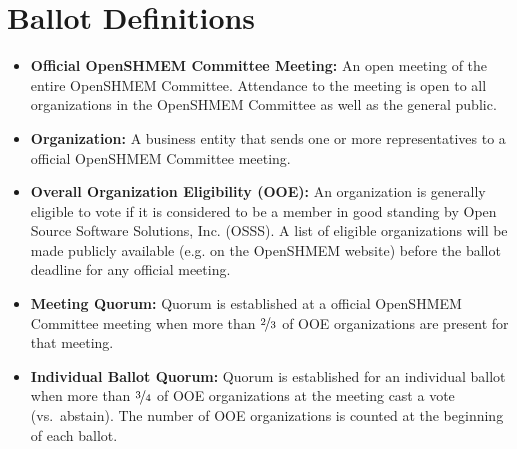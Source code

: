 \section{Ballot Definitions}

\begin{itemize}
\item {\bf Official OpenSHMEM Committee Meeting:} An open meeting of the entire
  OpenSHMEM Committee.  Attendance to the meeting is open to
  all organizations in the OpenSHMEM Committee as well as the general public.

\item {\bf Organization:} A business entity that sends one or more
  representatives to a official OpenSHMEM Committee meeting.

\item {\bf Overall Organization Eligibility (OOE):} An organization is
  generally eligible to vote if it
  is considered to be a member in good
  standing by Open Source Software Solutions, Inc. (OSSS).  A list of eligible
  organizations will be made publicly available (e.g. on the OpenSHMEM website)
  before the ballot deadline for any official meeting.

\item {\bf Meeting Quorum:} Quorum is established at a official OpenSHMEM
  Committee meeting when more than $\nicefrac{2}{3}$ of OOE organizations
  are present for that meeting.

\item {\bf Individual Ballot Quorum:} Quorum is established for an
  individual ballot when more than $\nicefrac{3}{4}$ of OOE
  organizations at the meeting cast a vote (vs.\ abstain).  The number
  of OOE organizations is counted at the beginning of each ballot.
\end{itemize}
